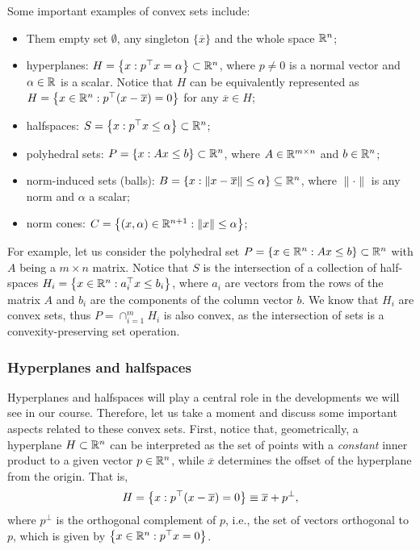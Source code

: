 Some important examples of convex sets include:
\begin{itemize}
	\item Them empty set $\emptyset$, any singleton $\{\overline{x}\}$ and the whole space $\mathbb{R}^n$; 
	\item hyperplanes: $H = \left\{ x : p^\top x = \alpha \right \} \subset \mathbb{R}^n$, where $p \neq 0$ is a normal vector and $\alpha\in \mathbb{R}$ is a scalar. Notice that $H$ can be equivalently represented as $H = \left\{ x \in \mathbb{R}^n: p^\top(x - \overline{x}) = 0 \right \}$ for any $\overline{x} \in H$;
	\item halfspaces: $S = \left\{ x : p^\top x \leq \alpha \right \} \subset \mathbb{R}^n$;
	\item polyhedral sets: $P = \left\{ x : Ax \leq b \right \} \subset \mathbb{R}^n$, where $A\in \mathbb{R}^{m\times n}$ and $b \in \mathbb{R}^n$;
	\item norm-induced sets (balls): $B = \left\{ x : \|x - \overline{x}\| \leq \alpha \right \} \subseteq \mathbb{R}^n$, where $\| \cdot \|$ is any norm and $\alpha$ a scalar;
	\item norm cones: $C =\left\{ (x,\alpha) \in \mathbb{R}^{n+1}: \|x\| \leq \alpha \right \} $;
\end{itemize} 

For example, let us consider the polyhedral set $P = \left\{ x \in \mathbb{R}^n : Ax \leq b \right \} \subset \mathbb{R}^n$ with $A$ being a $m \times n$ matrix. Notice that $S$ is the intersection of a collection of half-spaces $H_i = \left\{ x \in \mathbb{R}^n : a_i^\top x \leq b_i \right \}$, where $a_i$ are vectors from the rows of the matrix $A$ and $b_i$ are the components of the column vector $b$. We know that $H_i$ are convex sets, thus $P = \cap_{i=1}^m H_i$ is also convex, as the intersection of sets is a convexity-preserving set operation.


\subsubsection{Hyperplanes and halfspaces}

Hyperplanes and halfspaces will play a central role in the developments we will see in our course. Therefore, let us take a moment and discuss some important aspects related to these convex sets. First, notice that, geometrically, a hyperplane $H \subset \mathbb{R}^n$ can be interpreted as the set of points with a \emph{constant} inner product to a given vector $p \in \mathbb{R}^n$, while $\overline{x}$ determines the offset of the hyperplane from the origin. That is,
	\begin{equation*}
		H = \left\{ x : p^\top(x - \overline{x}) = 0 \right \} \equiv \overline{x} + p^{\perp},
	\end{equation*}
	where $p^\perp$ is the orthogonal complement of $p$, i.e., the set of vectors orthogonal to $p$, which is given by $\left\{ x \in \mathbb{R}^n : p^\top x = 0 \right \}$.
	
